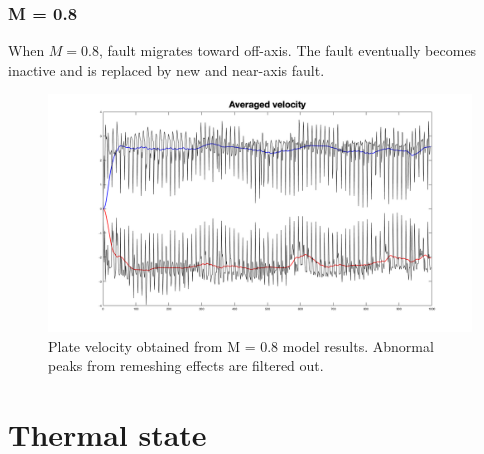 \documentclass[letterpaper,12pt,notitle]{memphisthesis}                     %
\begin{document}
\subsubsection{M = 0.8}

When $M=0.8$, fault migrates toward off-axis. The fault eventually becomes inactive and is replaced by new and near-axis fault.

\begin{figure}[!htb]
	\centering
	\includegraphics[width=0.99\linewidth]{./figs/m08vel.png}
	\caption{Plate velocity obtained from M = 0.8 model results. Abnormal peaks from remeshing effects are filtered out.}
	\label{fig:m08vel}
\end{figure}


\section{Thermal state}
\end{document}
